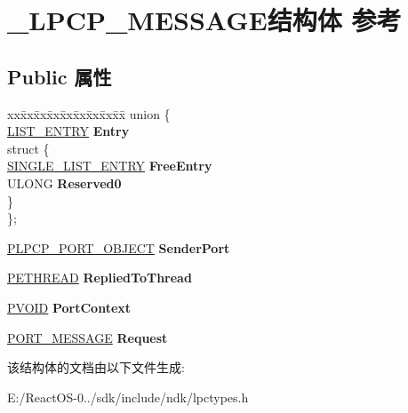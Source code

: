 \hypertarget{struct___l_p_c_p___m_e_s_s_a_g_e}{}\section{\+\_\+\+L\+P\+C\+P\+\_\+\+M\+E\+S\+S\+A\+G\+E结构体 参考}
\label{struct___l_p_c_p___m_e_s_s_a_g_e}
\subsection*{Public 属性}
\begin{DoxyCompactItemize}
\item 
\mbox{\label{struct___l_p_c_p___m_e_s_s_a_g_e_ab4955f0ee72825960ab743d7facf9a18}} 
\begin{tabbing}
xx\=xx\=xx\=xx\=xx\=xx\=xx\=xx\=xx\=\kill
union \{\\
\>\hyperlink{struct___l_i_s_t___e_n_t_r_y}{LIST\_ENTRY} {\bfseries Entry}\\
\mbox{\label{union___l_p_c_p___m_e_s_s_a_g_e_1_1_0D2146_a9012a5d0feefdcd985e63c0ac8aaa86e}} 
\>struct \{\\
\>\>\hyperlink{struct___s_i_n_g_l_e___l_i_s_t___e_n_t_r_y}{SINGLE\_LIST\_ENTRY} {\bfseries FreeEntry}\\
\>\>ULONG {\bfseries Reserved0}\\
\>\} \\
\}; \\

\end{tabbing}\item 
\mbox{\label{struct___l_p_c_p___m_e_s_s_a_g_e_af42ca22567a886b57b2001fc96aeb736}} 
\hyperlink{struct___l_p_c_p___p_o_r_t___o_b_j_e_c_t}{P\+L\+P\+C\+P\+\_\+\+P\+O\+R\+T\+\_\+\+O\+B\+J\+E\+CT} {\bfseries Sender\+Port}
\item 
\mbox{\label{struct___l_p_c_p___m_e_s_s_a_g_e_ae9b567e4a36a812f3570f92aaa85f7f9}} 
\hyperlink{struct___e_t_h_r_e_a_d}{P\+E\+T\+H\+R\+E\+AD} {\bfseries Replied\+To\+Thread}
\item 
\mbox{\label{struct___l_p_c_p___m_e_s_s_a_g_e_a252cd576a18dd29ea180a07800e79516}} 
\hyperlink{interfacevoid}{P\+V\+O\+ID} {\bfseries Port\+Context}
\item 
\mbox{\label{struct___l_p_c_p___m_e_s_s_a_g_e_a5f33c58ad0b188c444a6df54f1e334a0}} 
\hyperlink{struct___p_o_r_t___m_e_s_s_a_g_e___h_e_a_d_e_r}{P\+O\+R\+T\+\_\+\+M\+E\+S\+S\+A\+GE} {\bfseries Request}
\end{DoxyCompactItemize}


该结构体的文档由以下文件生成\+:\begin{DoxyCompactItemize}
\item 
E\+:/\+React\+O\+S-\/0../sdk/include/ndk/lpctypes.\+h\end{DoxyCompactItemize}
